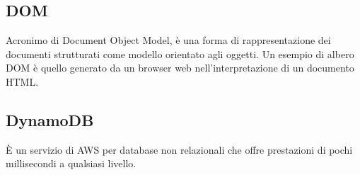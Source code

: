 \subsection{DOM}
Acronimo di Document Object Model,  è una forma di rappresentazione dei documenti strutturati come modello orientato agli oggetti. Un esempio di albero DOM è quello generato da un browser web nell'interpretazione di un documento HTML.

\subsection{DynamoDB}
È un servizio di AWS per database non relazionali che offre prestazioni di pochi millisecondi a qualsiasi livello.
